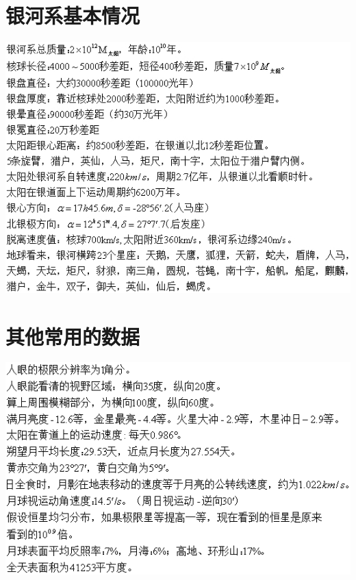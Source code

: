 \section{银河系基本情况}
\includegraphics{const_milky_way.jpg}

\section{其他常用的数据}
\includegraphics[scale=1.1]{const4.png}
